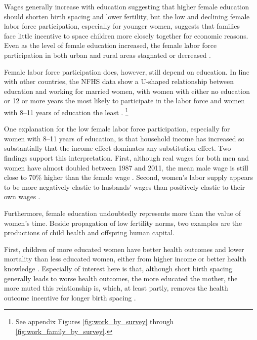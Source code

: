 Wages generally increase with education suggesting that higher female education
should shorten birth spacing and lower fertility, but the low and declining female labor 
force participation, especially for younger women, suggests that families face little 
incentive to space children more closely together for economic reasons.
Even as the level of female education increased, the female labor force participation 
in both urban and rural areas stagnated or decreased 
\citep{Klasen2015,Fletcher2017,Afridi2018,Bhargava2018,Chatterjee2018,Bhargava2019}.

Female labor force participation does, however, still depend on education.
In line with other countries, the NFHS data show a U-shaped relationship between 
education and working for married women, with women with either no education or 12 or more 
years the most likely to participate in the labor force and women with 8--11 years of 
education the least \citep{Goldin1994,Chatterjee2018}.%
\footnote{
See appendix Figures \ref{fig:work_by_survey} through \ref{fig:work_family_by_survey}. 
}

One explanation for the low female labor force participation, especially for women
with 8--11 years of education, is that household income has increased so substantially 
that the income effect dominates any substitution effect.
Two findings support this interpretation.
First, although real wages for both men and women have almost doubled between 1987 and 
2011, the mean male wage is still close to 70\% higher than the female wage 
\citep{Klasen2015,Bhargava2018}.
Second, women’s labor supply appears to be more negatively elastic to husbands' 
wages than positively elastic to their own wages \citep{Bhargava2018}.

Furthermore, female education undoubtedly represents more than the value of women's time.
Beside propagation of low fertility norms, two examples are the productions of child 
health and offspring human capital.

First, children of more educated women have better health outcomes and lower mortality 
than less educated women, either from higher income or better health knowledge 
\citep{Rosenzweig1982a,Kovsted2002,Whitworth2002,Maitra2008}.
Especially of interest here is that, although short birth spacing generally leads to worse 
health outcomes, the more educated the mother, the more muted this relationship is, which, 
at least partly, removes the health outcome incentive for longer birth spacing
\citep{Molitoris2019}.


